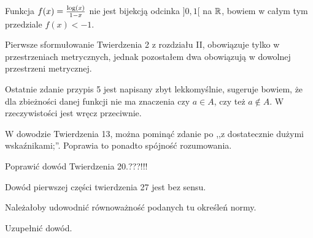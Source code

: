 \documentclass[a4paper,11pt]{article}
\begin{document}
\vspace{\spaceFour}


\start {} Funkcja $f( x ) = \frac{ \log( x ) }{ 1 - x }$ nie jest
bijekcją odcinka $] 0, 1 [$ na $\mathbb{R}$, bowiem w całym tym przedziale
$f( x ) < -1$.

\vspace{\spaceFour}


\start {} Pierwsze sformułowanie Twierdzenia 2 z rozdziału II,
obowiązuje tylko w przestrzeniach metrycznych, jednak pozostałem dwa
obowiązują w dowolnej przestrzeni metrycznej.

\vspace{\spaceFour}


\start {} Ostatnie zdanie przypis 5 jest napisany zbyt
lekkomyślnie, sugeruje bowiem, że dla zbieżności danej funkcji nie ma
znaczenia czy $a \in A$, czy też $a \notin A$. W rzeczywistości jest
wręcz przeciwnie.

\vspace{\spaceFour}


\start {} W dowodzie Twierdzenia 13, można pominąć zdanie po ,,z
dostatecznie dużymi wskaźnikami;''. Poprawia to ponadto spójność
rozumowania.

\vspace{\spaceFour}

  
\start {} Poprawić dowód Twierdzenia 20.???!!!

\vspace{\spaceFour}


\start {} Dowód pierwszej części twierdzenia 27 jest bez sensu.

\vspace{\spaceFour}


\start {} Należałoby udowodnić równoważność podanych tu określeń
normy.

\vspace{\spaceFour}


\start {} Uzupełnić dowód.

\vspace{\spaceFour}
\end{document}
